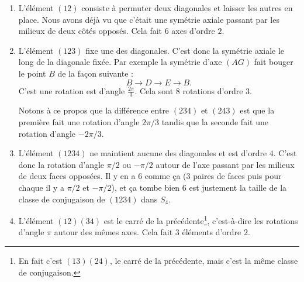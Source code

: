 \begin{enumerate}
    \item
        L'élément \( (12)\) consiste à permuter deux diagonales et laisser les autres en place. Nous avons déjà vu que c'était une symétrie axiale passant par les milieux de deux côtés opposés. Cela fait \( 6\) axes d'ordre \( 2\).
    \item
        L'élément \( (123)\) fixe une des diagonales. C'est donc la symétrie axiale le long de la diagonale fixée. Par exemple la symétrie d'axe \( (AG)\) fait bouger le point \( B\) de la façon suivante :
        \begin{equation}
            B\to D\to E\to B.
        \end{equation}
        C'est une rotation est d'angle \( \frac{ 2\pi }{ 3 }\). Cela sont \( 8\) rotations d'ordre \( 3\).

        Notons à ce propos que la différence entre \( (234)\) et \( (243)\) est que la première fait une rotation d'angle \( 2\pi/3\) tandis que la seconde fait une rotation d'angle \( -2\pi/3\).

    \item
        L'élément \( (1234)\) ne maintient aucune des diagonales et est d'ordre \( 4\). C'est donc la rotation d'angle \( \pi/2\) ou \( -\pi/2\) autour de l'axe passant par les milieux de deux faces opposées. Il y en a \( 6\) comme ça (\( 3\) paires de faces puis pour chaque il y a \( \pi/2\) et \( -\pi/2\)), et ça tombe bien \( 6\) est justement la taille de la classe de conjugaison de \( (1234)\) dans \( S_4\).

    \item
        L'élément \( (12)(34)\) est le carré de la précédente\footnote{En fait c'est \( (13)(24)\), le carré de la précédente, mais c'est la même classe de conjugaison.}, c'est-à-dire les rotations d'angle \( \pi\) autour des mêmes axes. Cela fait \( 3\) éléments d'ordre \( 2\).

\end{enumerate}


